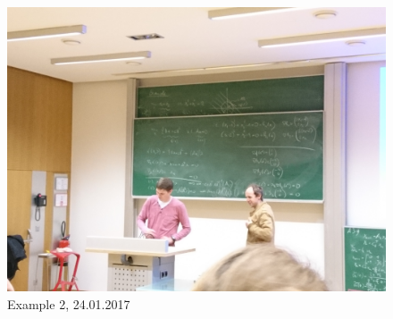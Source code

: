 \documentclass{report}
\begin{document}
\begin{figure}[H]
\includegraphics[width=\textwidth]{2017_01_24-ex2.jpg}
\caption{Example 2,  24.01.2017\label{fig:ex2}}
\end{figure}
\end{document}
